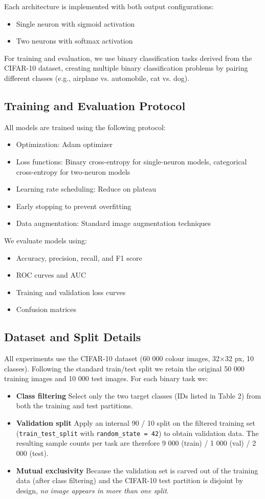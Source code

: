 \documentclass[11pt]{article}
\begin{document}
Each architecture is implemented with both output configurations:
\begin{itemize}
\item Single neuron with sigmoid activation
\item Two neurons with softmax activation
\end{itemize}

For training and evaluation, we use binary classification tasks derived from the CIFAR-10 dataset, creating multiple binary classification problems by pairing different classes (e.g., airplane vs. automobile, cat vs. dog).

\subsection{Training and Evaluation Protocol}
All models are trained using the following protocol:
\begin{itemize}
\item Optimization: Adam optimizer
\item Loss functions: Binary cross-entropy for single-neuron models, categorical cross-entropy for two-neuron models
\item Learning rate scheduling: Reduce on plateau
\item Early stopping to prevent overfitting
\item Data augmentation: Standard image augmentation techniques
\end{itemize}

We evaluate models using:
\begin{itemize}
\item Accuracy, precision, recall, and F1 score
\item ROC curves and AUC
\item Training and validation loss curves
\item Confusion matrices
\end{itemize}

\subsection{Dataset and Split Details}
All experiments use the CIFAR-10 dataset (60 000 colour images, 32×32 px, 10 classes). Following the standard train/test split we retain the original 50 000 training images and 10 000 test images. For each binary task we:
\begin{itemize}
\item \textbf{Class filtering} Select only the two target classes (IDs listed in Table 2) from both the training and test partitions.
\item \textbf{Validation split} Apply an internal 90 / 10 split on the filtered training set (\texttt{train\_test\_split} with \texttt{random\_state = 42}) to obtain validation data. The resulting sample counts per task are therefore 9 000 (train) / 1 000 (val) / 2 000 (test).
\item \textbf{Mutual exclusivity} Because the validation set is carved out of the training data (after class filtering) and the CIFAR-10 test partition is disjoint by design, \textit{no image appears in more than one split}.
\end{itemize}
\end{document}
